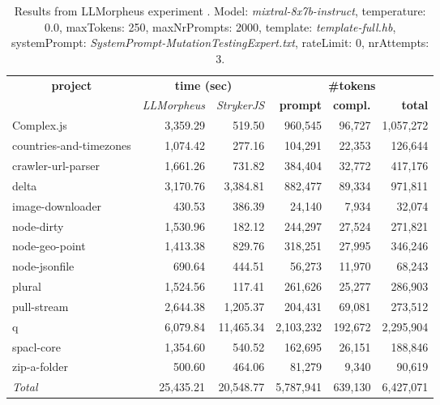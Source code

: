 
\begin{table*}[hbt!]
\centering
{\scriptsize
\begin{tabular}{l||r|r|r|r|r}
\multicolumn{1}{c|}{\bf project} & \multicolumn{2}{|c|}{\bf time (sec)} & \multicolumn{3}{|c|}{\bf \#tokens} \\
               & {\it LLMorpheus} & {\it StrykerJS} & {\bf prompt} & {\bf compl.} & {\bf total} \\
\hline
  Complex.js & 3,359.29 & 519.50 & 960,545 & 96,727 & 1,057,272 \\ 
countries-and-timezones & 1,074.42 & 277.16 & 104,291 & 22,353 & 126,644 \\ 
crawler-url-parser & 1,661.26 & 731.82 & 384,404 & 32,772 & 417,176 \\ 
delta & 3,170.76 & 3,384.81 & 882,477 & 89,334 & 971,811 \\ 
image-downloader & 430.53 & 386.39 & 24,140 & 7,934 & 32,074 \\ 
node-dirty & 1,530.96 & 182.12 & 244,297 & 27,524 & 271,821 \\ 
node-geo-point & 1,413.38 & 829.76 & 318,251 & 27,995 & 346,246 \\ 
node-jsonfile & 690.64 & 444.51 & 56,273 & 11,970 & 68,243 \\ 
plural & 1,524.56 & 117.41 & 261,626 & 25,277 & 286,903 \\ 
pull-stream & 2,644.38 & 1,205.37 & 204,431 & 69,081 & 273,512 \\ 
q & 6,079.84 & 11,465.34 & 2,103,232 & 192,672 & 2,295,904 \\ 
spacl-core & 1,354.60 & 540.52 & 162,695 & 26,151 & 188,846 \\ 
zip-a-folder & 500.60 & 464.06 & 81,279 & 9,340 & 90,619 \\ 
\hline
  \textit{Total} & 25,435.21 & 20,548.77 & 5,787,941 & 639,130 & 6,427,071 \\
  \end{tabular}
  }
  \\[2mm]
  \caption{Results from LLMorpheus experiment .
    Model: \textit{mixtral-8x7b-instruct}, 
    temperature: 0.0, 
    maxTokens: 250, 
    maxNrPrompts: 2000, 
    template: \textit{template-full.hb}, 
    systemPrompt: \textit{SystemPrompt-MutationTestingExpert.txt}, 
    rateLimit: 0, 
    nrAttempts: 3.  
  }
  \label{table:Cost:run362:mixtral-8x7b-instruct:template-full.hb:0.0}
\end{table*}